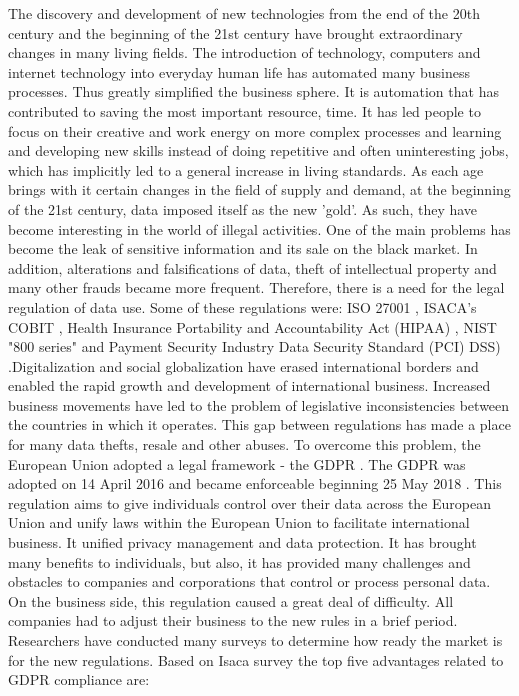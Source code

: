 \documentclass[11pt,english]{article}
\begin{document}
\quad The discovery and development of new technologies from the end of the 20th century and the beginning of the 21st century have brought extraordinary changes in many living fields. The introduction of technology, computers and internet technology into everyday human life has automated many business processes. Thus greatly simplified the business sphere. It is automation that has contributed to saving the most important resource, time. It has led people to focus on their creative and work energy on more complex processes and learning and developing new skills instead of doing repetitive and often uninteresting jobs, which has implicitly led to a general increase in living standards. \newline As each age brings with it certain changes in the field of supply and demand, at the beginning of the 21st century, data imposed itself as the new 'gold'. As such, they have become interesting in the world of illegal activities. One of the main problems has become the leak of sensitive information and its sale on the black market. In addition, alterations and falsifications of data, theft of intellectual property and many other frauds became more frequent. Therefore, there is a need for the legal regulation of data use. Some of these regulations were: ISO 27001 \cite{iso}, ISACA's COBIT \cite{cobit}, Health Insurance Portability and Accountability Act (HIPAA) \cite{hipaa}, NIST "800 series" \cite{nist} and Payment Security Industry Data Security Standard (PCI) DSS) \cite{pci}.\newline Digitalization and social globalization have erased international borders and enabled the rapid growth and development of international business. Increased business movements have led to the problem of legislative inconsistencies between the countries in which it operates. This gap between regulations has made a place for many data thefts, resale and other abuses. To overcome this problem, the European Union adopted a legal framework - the GDPR \cite{gdprRegulation}. The GDPR was adopted on 14 April 2016 and became enforceable beginning 25 May 2018 \cite{gdpr}. This regulation aims to give individuals control over their data across the European Union and unify laws within the European Union to facilitate international business. It unified privacy management and data protection. It has brought many benefits to individuals, but also, it has provided many challenges and obstacles to companies and corporations that control or process personal data. On the business side, this regulation caused a great deal of difficulty. All companies had to adjust their business to the new rules in a brief period. \newline \quad Researchers have conducted many surveys to determine how ready the market is for the new regulations. Based on Isaca survey \cite{isaca} the top five advantages related to GDPR compliance are:
\end{document}
